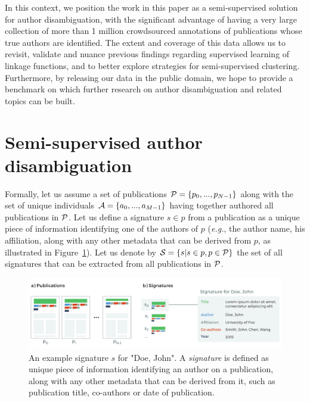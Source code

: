 \documentclass{article}
\newcommand{\eg}{\emph{e.g.}\xspace}
\begin{document}
In this context, we position the work in this paper as a
semi-supervised solution for author disambiguation, with the significant
advantage of having a very large collection of more than 1 million crowdsourced annotations
of publications whose true authors are identified.
The extent and coverage of this data allows us to revisit, validate and nuance previous
findings regarding supervised learning of linkage functions, and to better explore strategies
for semi-supervised clustering.
Furthermore, by releasing our data in the public domain, we hope to provide a benchmark on
which further research on author disambiguation and related topics can be built.




\section{Semi-supervised author disambiguation}
\label{methods}

Formally, let us assume a set of publications ${\cal P} = \{ p_0, ...,
p_{N-1}\}$ along with the set of unique individuals ${\cal A} = \{ a_0, ...,
a_{M-1}\}$ having together authored all publications in ${\cal P}$.  Let us
define a signature $s \in p$ from a publication as a unique piece of
information identifying one of the authors of $p$ (\eg, the author name, his
affiliation, along with any other metadata that can be derived from $p$, as illustrated in Figure~\ref{fig:signature}). Let us
denote by ${\cal S} = \{ s | s \in p, p \in {\cal P} \}$ the set of all
signatures that can be extracted from all publications in ${\cal P}$.

\begin{figure}
\centering
\includegraphics[width=\textwidth]{figures/pub-to-signature}
\caption{An example signature $s$ for "Doe, John". A \textit{signature} is
defined as unique piece of information identifying an author on a publication,
along with any other metadata that can be derived from it, such as publication
title, co-authors or date of publication.}
\label{fig:signature}
\end{figure}
\end{document}
